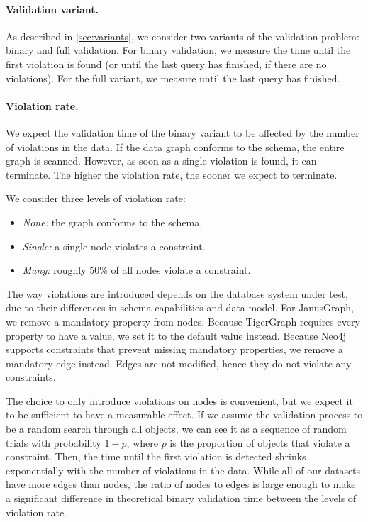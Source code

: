 \documentclass{report}
\theoremstyle{definition}
\begin{document}
\paragraph{Validation variant.} As described in \autoref{sec:variants}, we consider two variants of the validation problem: binary and full validation. For binary validation, we measure the time until the first violation is found (or until the last query has finished, if there are no violations). For the full variant, we measure until the last query has finished.

\paragraph{Violation rate.} We expect the validation time of the binary variant to be affected by the number of violations in the data. If the data graph conforms to the schema, the entire graph is scanned. However, as soon as a single violation is found, it can terminate. The higher the violation rate, the sooner we expect to terminate.

We consider three levels of violation rate:

\begin{itemize}
  \item \emph{None:} the graph conforms to the schema.
  \item \emph{Single:} a single node violates a constraint.
  \item \emph{Many:} roughly 50\% of all nodes violate a constraint.
\end{itemize}

The way violations are introduced depends on the database system under test, due to their differences in schema capabilities and data model. For JanusGraph, we remove a mandatory property from nodes. Because TigerGraph requires every property to have a value, we set it to the default value instead. Because Neo4j supports constraints that prevent missing mandatory properties, we remove a mandatory edge instead. Edges are not modified, hence they do not violate any constraints.

The choice to only introduce violations on nodes is convenient, but we expect it to be sufficient to have a measurable effect. If we assume the validation process to be a random search through all objects, we can see it as a sequence of random trials with probability $1-p$, where $p$ is the proportion of objects that violate a constraint. Then, the time until the first violation is detected shrinks exponentially with the number of violations in the data. While all of our datasets have more edges than nodes, the ratio of nodes to edges is large enough to make a significant difference in theoretical binary validation time between the levels of violation rate.
\end{document}
